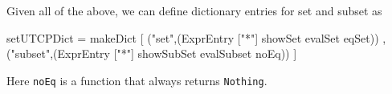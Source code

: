 Given all of the above,
we can define dictionary entries for set and subset as
\begin{code}
setUTCPDict
 = makeDict
    [ ("set",(ExprEntry ["*"] showSet evalSet eqSet))
    , ("subset",(ExprEntry ["*"] showSubSet evalSubset noEq)) ]
\end{code}
Here \texttt{noEq} is a function that always returns \texttt{Nothing}.
